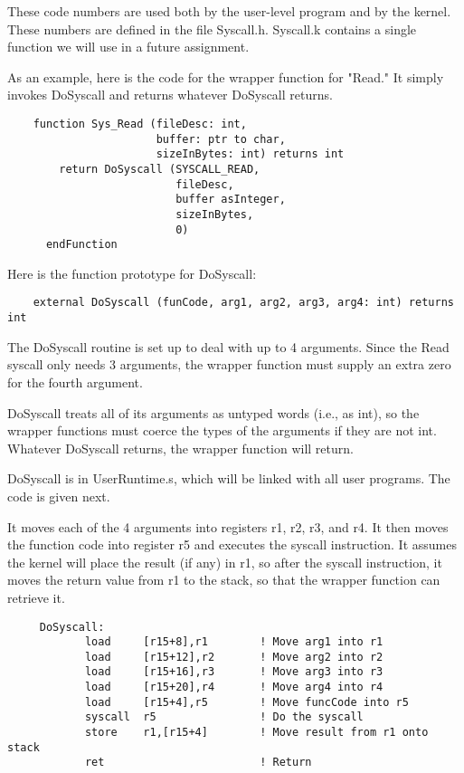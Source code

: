 \documentclass[12pt]{article}
\begin{document}
These code numbers are used both by the user-level program and by the
kernel.  These numbers are defined in the file Syscall.h.   Syscall.k
contains a single function we will use in a future assignment.

As an example, here is the code for the wrapper function for "Read."
It simply invokes DoSyscall and returns whatever DoSyscall returns.

\begin{verbatim}
    function Sys_Read (fileDesc: int,
                       buffer: ptr to char,
                       sizeInBytes: int) returns int
        return DoSyscall (SYSCALL_READ,
                          fileDesc,
                          buffer asInteger,
                          sizeInBytes,
                          0)
      endFunction
\end{verbatim}

Here is the function prototype for DoSyscall:

\begin{verbatim}
    external DoSyscall (funCode, arg1, arg2, arg3, arg4: int) returns int 
\end{verbatim}

The DoSyscall routine is set up to deal with up to 4 arguments.  Since
the Read syscall only needs 3 arguments, the wrapper function must
supply an extra zero for the fourth argument.

DoSyscall treats all of its arguments as untyped words (i.e., as int),
so the wrapper functions must coerce the types of the arguments if
they are not int.  Whatever DoSyscall returns, the wrapper function
will return.

DoSyscall is in UserRuntime.s, which will be linked with all user
programs.  The code is given next.

It moves each of the 4 arguments into registers r1, r2, r3, and r4.
It then moves the function code into register r5 and executes the
syscall instruction.  It assumes the kernel will place the result (if
any) in r1, so after the syscall instruction, it moves the return
value from r1 to the stack, so that the wrapper function can retrieve
it.

\begin{verbatim}
     DoSyscall:
            load     [r15+8],r1        ! Move arg1 into r1
            load     [r15+12],r2       ! Move arg2 into r2
            load     [r15+16],r3       ! Move arg3 into r3
            load     [r15+20],r4       ! Move arg4 into r4
            load     [r15+4],r5        ! Move funcCode into r5
            syscall  r5                ! Do the syscall
            store    r1,[r15+4]        ! Move result from r1 onto stack
            ret                        ! Return
\end{verbatim}
\end{document}
